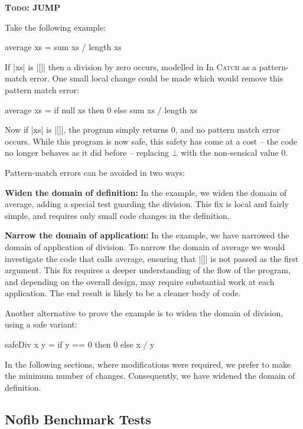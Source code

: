 \documentclass[preprint]{sigplanconf}
\newcommand{\C}[1]{\textsf{#1}}
\newcommand{\catch}{\textsc{Catch}}
\newcommand{\todo}[1]{\textbf{\textsc{Todo:} #1}}
\newcommand{\para}[1]{\vspace{2mm}\noindent\textbf{#1}}
\begin{document}
\todo{JUMP}

Take the following example:

\begin{code}
average xs = sum xs / length xs
\end{code}

If |xs| is |[]| then a division by zero occurs, modelled in  In \catch{} as a pattern-match error. One small local change could be made which would remove this pattern match error:

\begin{code}
average xs = if null xs then 0 else sum xs / length xs
\end{code}

Now if |xs| is |[]|, the program simply returns 0, and no pattern match error occurs. While this program is now safe, this safety has come at a cost -- the code no longer behaves as it did before -- replacing $\bot{}$ with the non-sensical value 0.

Pattern-match errors can be avoided in two ways:

\para{Widen the domain of definition:} In the example, we widen the domain of \C{average}, adding a special test guarding the division. This fix is local and fairly simple, and requires only small code changes in the definition.

\para{Narrow the domain of application:} In the example, we have narrowed the domain of application of division. To narrow the domain of \C{average} we would investigate the code that calls \C{average}, ensuring that |[]| is not passed as the first argument. This fix requires a deeper understanding of the flow of the program, and depending on the overall design, may require substantial work at each application. The end result is likely to be a cleaner body of code.

Another alternative to prove the example is to widen the domain of division, using a safe variant:

\begin{code}
safeDiv x y = if y == 0 then 0 else x / y
\end{code}

In the following sections, where modifications were required, we prefer to make the minimum number of changes. Consequently, we have widened the domain of definition.

\subsection{Nofib Benchmark Tests}
\label{sec:imaginary}
\end{document}
